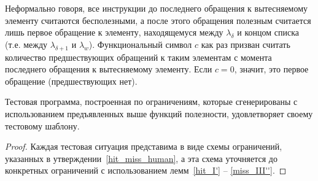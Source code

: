 Неформально говоря, все инструкции до последнего обращения к
вытесняемому элементу считаются бесполезными, а после этого
обращения полезным считается лишь первое обращение к элементу,
находящемуся между $\lambda_\delta$ и концом списка (т.е. между
$\lambda_{\delta+1}$ и $\lambda_w$). Функциональный символ $c$ как
раз призван считать количество предшествующих обращений к таким
элементам с момента последнего обращения к вытесняемому элементу.
Если $c = 0$, значит, это первое обращение (предшествующих нет).

\begin{theorem}\label{thm_lru_usefulness_correct} Тестовая программа,
построенная по ограничениям, которые сгенерированы с использованием
предъявленных выше функций полезности, удовлетворяет своему
тестовому шаблону.
\end{theorem}
\begin{proof}
  Каждая тестовая ситуация представима в виде схемы ограничений,
  указанных в утверждении~\ref{hit_miss_human}, а эта схема
  уточняется до конкретных ограничений с использованием
  лемм~\ref{hit_I'} -- \ref{miss_III''}.
\end{proof}

